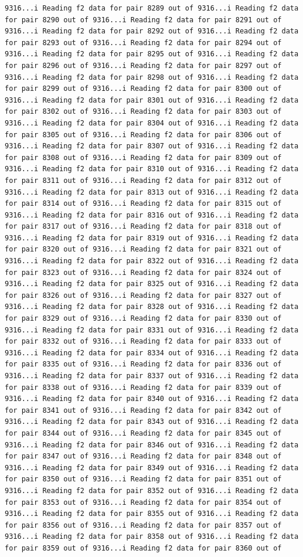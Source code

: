 \documentclass[
]{article}
\begin{document}
\begin{verbatim}
9316...i Reading f2 data for pair 8289 out of 9316...i Reading f2 data for pair 8290 out of 9316...i Reading f2 data for pair 8291 out of 9316...i Reading f2 data for pair 8292 out of 9316...i Reading f2 data for pair 8293 out of 9316...i Reading f2 data for pair 8294 out of 9316...i Reading f2 data for pair 8295 out of 9316...i Reading f2 data for pair 8296 out of 9316...i Reading f2 data for pair 8297 out of 9316...i Reading f2 data for pair 8298 out of 9316...i Reading f2 data for pair 8299 out of 9316...i Reading f2 data for pair 8300 out of 9316...i Reading f2 data for pair 8301 out of 9316...i Reading f2 data for pair 8302 out of 9316...i Reading f2 data for pair 8303 out of 9316...i Reading f2 data for pair 8304 out of 9316...i Reading f2 data for pair 8305 out of 9316...i Reading f2 data for pair 8306 out of 9316...i Reading f2 data for pair 8307 out of 9316...i Reading f2 data for pair 8308 out of 9316...i Reading f2 data for pair 8309 out of 9316...i Reading f2 data for pair 8310 out of 9316...i Reading f2 data for pair 8311 out of 9316...i Reading f2 data for pair 8312 out of 9316...i Reading f2 data for pair 8313 out of 9316...i Reading f2 data for pair 8314 out of 9316...i Reading f2 data for pair 8315 out of 9316...i Reading f2 data for pair 8316 out of 9316...i Reading f2 data for pair 8317 out of 9316...i Reading f2 data for pair 8318 out of 9316...i Reading f2 data for pair 8319 out of 9316...i Reading f2 data for pair 8320 out of 9316...i Reading f2 data for pair 8321 out of 9316...i Reading f2 data for pair 8322 out of 9316...i Reading f2 data for pair 8323 out of 9316...i Reading f2 data for pair 8324 out of 9316...i Reading f2 data for pair 8325 out of 9316...i Reading f2 data for pair 8326 out of 9316...i Reading f2 data for pair 8327 out of 9316...i Reading f2 data for pair 8328 out of 9316...i Reading f2 data for pair 8329 out of 9316...i Reading f2 data for pair 8330 out of 9316...i Reading f2 data for pair 8331 out of 9316...i Reading f2 data for pair 8332 out of 9316...i Reading f2 data for pair 8333 out of 9316...i Reading f2 data for pair 8334 out of 9316...i Reading f2 data for pair 8335 out of 9316...i Reading f2 data for pair 8336 out of 9316...i Reading f2 data for pair 8337 out of 9316...i Reading f2 data for pair 8338 out of 9316...i Reading f2 data for pair 8339 out of 9316...i Reading f2 data for pair 8340 out of 9316...i Reading f2 data for pair 8341 out of 9316...i Reading f2 data for pair 8342 out of 9316...i Reading f2 data for pair 8343 out of 9316...i Reading f2 data for pair 8344 out of 9316...i Reading f2 data for pair 8345 out of 9316...i Reading f2 data for pair 8346 out of 9316...i Reading f2 data for pair 8347 out of 9316...i Reading f2 data for pair 8348 out of 9316...i Reading f2 data for pair 8349 out of 9316...i Reading f2 data for pair 8350 out of 9316...i Reading f2 data for pair 8351 out of 9316...i Reading f2 data for pair 8352 out of 9316...i Reading f2 data for pair 8353 out of 9316...i Reading f2 data for pair 8354 out of 9316...i Reading f2 data for pair 8355 out of 9316...i Reading f2 data for pair 8356 out of 9316...i Reading f2 data for pair 8357 out of 9316...i Reading f2 data for pair 8358 out of 9316...i Reading f2 data for pair 8359 out of 9316...i Reading f2 data for pair 8360 out of 
\end{verbatim}
\end{document}
